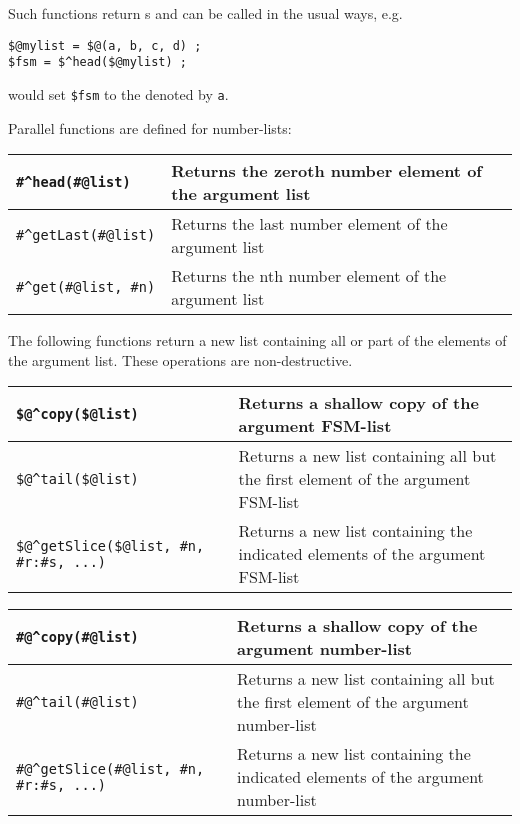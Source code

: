 \vspace{.5cm}

\noindent
Such functions return \fsm{}s and can be called in the usual ways, 
e.g.

\begin{Verbatim}
$@mylist = $@(a, b, c, d) ;
$fsm = $^head($@mylist) ;
\end{Verbatim}

\noindent
would set \verb!$fsm! to the \fsm{} denoted by \texttt{a}.

Parallel functions are defined for number-lists:

\vspace{.5cm}

\noindent
\begin{tabular}{|l|l|}
\hline
\verb!#^head(#@list)! & Returns the zeroth number element of the argument list\\
\hline
\verb!#^getLast(#@list)! & Returns the last number element of the argument list\\
\hline
\verb!#^get(#@list, #n)! & Returns the nth number element of the argument list\\
\hline
\end{tabular}

\vspace{.5cm}

The following functions return a new list containing all or part of the
elements of the argument list.  These operations are non-destructive.

\vspace{.5cm}

\noindent
\begin{tabular}{|l|p{4.5cm}|}
\hline
\verb!$@^copy($@list)! & Returns a shallow copy of the argument FSM-list\\
\hline
\verb!$@^tail($@list)! & Returns a new list containing all but the first element of the
argument FSM-list\\
\hline
\verb!$@^getSlice($@list, #n, #r:#s, ...)! & Returns a new list containing the
indicated elements of the argument FSM-list\\
\hline
\end{tabular}

\vspace{.5cm}

\noindent
\begin{tabular}{|l|p{4.5cm}|}
\hline
\verb!#@^copy(#@list)! & Returns a shallow copy of the argument number-list\\
\hline
\verb!#@^tail(#@list)! & Returns a new list containing all but the first element of the
argument number-list\\
\hline
\verb!#@^getSlice(#@list, #n, #r:#s, ...)! & Returns a new list containing the
indicated elements of the argument number-list\\
\hline
\end{tabular}

